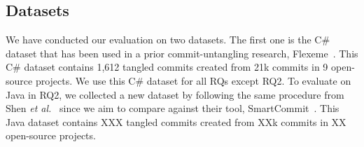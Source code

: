 \subsection{Datasets}

We have conducted our evaluation on two datasets. The first one is the
C\# dataset that has been used in a prior commit-untangling research,
Flexeme~\cite{flexeme-fse20}. This C\# dataset contains 1,612 tangled
commits created from 21k commits in 9 open-source projects. We use
this C\# dataset for all RQs except RQ2. To evaluate {\tool} on Java
in RQ2, we collected a new dataset by following the same procedure
from Shen {\em et al.}~\cite{smartcommit-fse21} since we aim to
compare {\tool} against their tool,
SmartCommit~\cite{smartcommit-fse21}. This Java dataset contains XXX
tangled commits created from XXk commits in XX open-source projects.


